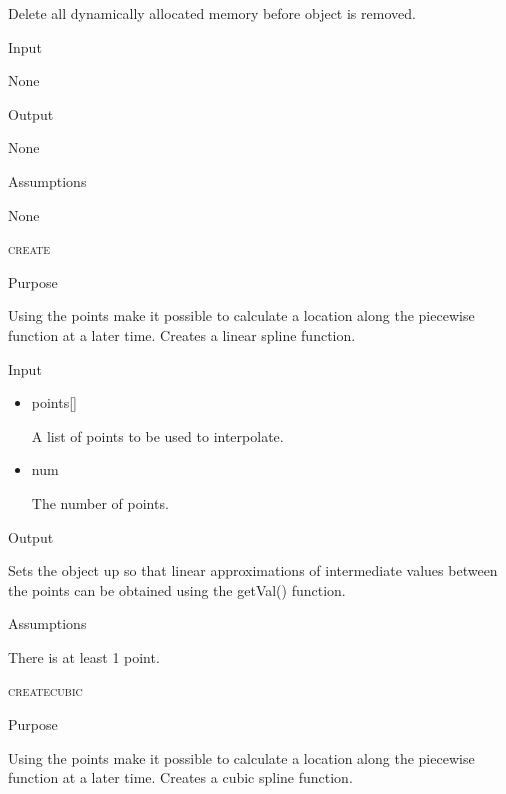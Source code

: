 \documentclass[pdftex, 11pt]{article}
\begin{document}
\begin{description}
\begin{description}
				Delete all dynamically allocated memory before object is removed.

			\item{Input}

				None

			\item{Output}

				None

			\item{Assumptions}

				None

		\end{description}


	\item{\textsc{create}}
		\begin{description}
			\item{Purpose}

				Using the points make it possible to calculate a location along the
				piecewise function at a later time.  Creates a linear spline function.

			\item{Input}

				\begin{itemize}

					\item{points[]}

						A list of points to be used to interpolate.

					\item{num}

						The number of points.

				\end{itemize}

			\item{Output}

				Sets the object up so that linear approximations of intermediate values between
				the points can be obtained using the getVal() function.

			\item{Assumptions}

				There is at least 1 point.

		\end{description}


	\item{\textsc{createcubic}}
		\begin{description}
			\item{Purpose}

				Using the points make it possible to calculate a location along the
				piecewise function at a later time.  Creates a cubic spline function.


\end{description}
\end{description}
\end{document}
